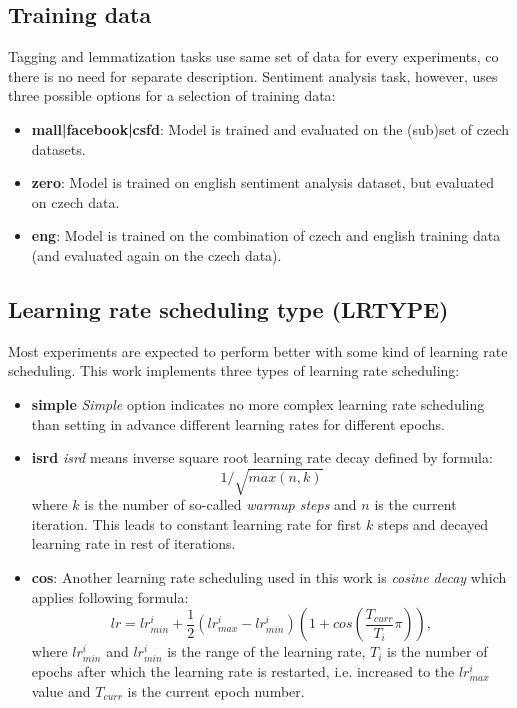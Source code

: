 \subsection{Training data}
Tagging and lemmatization tasks use same set of data for every experiments, co there is no need for separate description. Sentiment analysis task, however, uses three possible options for a selection of training data:
\begin{itemize}
\item \textbf{mall|facebook|csfd}: Model is trained and evaluated on the (sub)set of czech datasets.
\item \textbf{zero}: Model is trained on english sentiment analysis dataset, but evaluated on czech data.
\item \textbf{eng}: Model is trained on the combination of czech and english training data (and evaluated again on the czech data). %
\end{itemize}
\subsection{Learning rate scheduling type (LRTYPE)}
Most experiments are expected to perform better with some kind of learning rate scheduling. This work implements three types of learning rate scheduling:
\begin{itemize}
\item \textbf{simple} \textit{Simple} option indicates no more complex learning rate scheduling than setting in advance different learning rates for different epochs.
\item \textbf{isrd} %
\textit{isrd} means inverse square root learning rate decay defined by formula: $$1/\sqrt{max(n,k)}$$ where $k$ is the number of so-called \textit{warmup steps} and $n$ is the current iteration. This leads to constant learning rate for first $k$ steps and decayed learning rate in rest of iterations.
\item \textbf{cos}: Another learning rate scheduling used in this work is \textit{cosine decay} %
which applies following formula: $$lr=lr_{min}^{i} + \frac{1}{2}(lr_{max}^{i} - lr_{min}^{i})(1+cos(\frac{T_{curr}}{T_i}\pi)),$$ where $lr_{min}^{i}$ and $lr_{min}^{i}$ is the range of the learning rate, $T_i$ is the number of epochs after which the learning rate is restarted, i.e. increased to the $lr_{max}^{i}$ value and $T_{curr}$ is the current epoch number.
\end{itemize}

